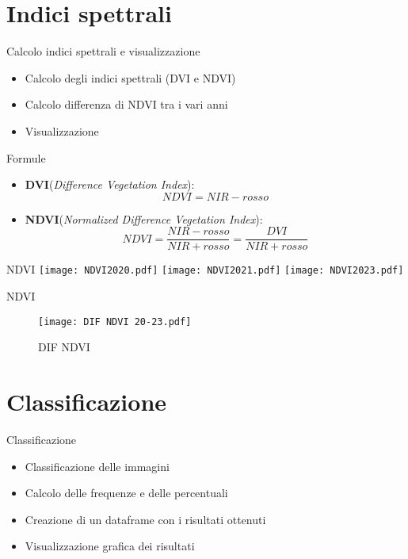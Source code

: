 \documentclass{beamer}
\begin{document}
\section{Indici spettrali}

\begin{frame}{Calcolo indici spettrali e visualizzazione}
\begin{itemize}
    \item Calcolo degli indici spettrali (DVI e NDVI)
    \item \pause Calcolo differenza di NDVI tra i vari anni
    \item \pause Visualizzazione
\end{itemize}
    
\end{frame}

\begin{frame}{Formule}
    \begin{itemize}
    \item  \textbf{DVI}(\textit{Difference Vegetation Index}):
    \begin{equation}
        NDVI = NIR - rosso
    \end{equation}
    \item \textbf{NDVI}(\textit{Normalized Difference Vegetation Index}):
    \begin{equation}
        NDVI = \frac{NIR - rosso}{NIR + rosso} = \frac{DVI}{NIR + rosso}
    \end{equation}
\end{itemize}
\end{frame}

\begin{frame}{NDVI}
\texttt{[image: NDVI2020.pdf]}
\texttt{[image: NDVI2021.pdf]}
\texttt{[image: NDVI2023.pdf]}
\end{frame}

\begin{frame}{NDVI}
\begin{figure}
    \texttt{[image: DIF NDVI 20-23.pdf]}
    \caption{DIF NDVI}
    \end{figure}
\end{frame}

\section{Classificazione}

\begin{frame}{Classificazione}
\begin{itemize}
    \item Classificazione delle immagini
    \item \pause Calcolo delle frequenze e delle percentuali
    \item \pause Creazione di un dataframe con i risultati ottenuti
    \item \pause Visualizzazione grafica dei risultati
\end{itemize}
\end{frame}
\end{document}
